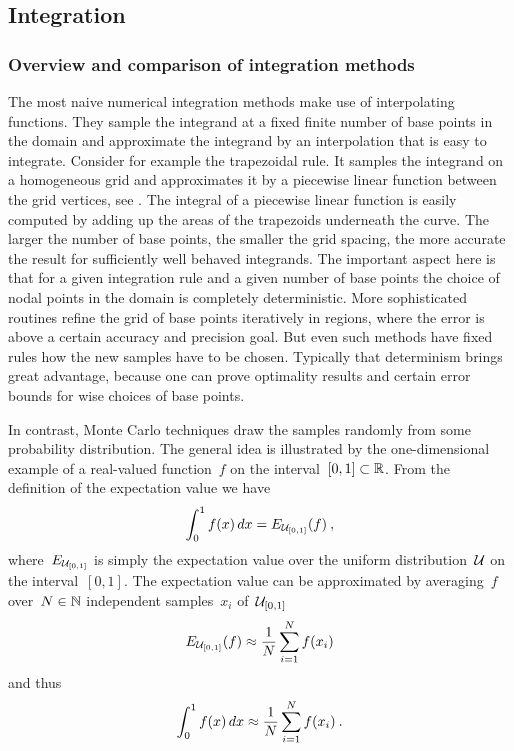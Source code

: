 \subsection{Integration}

\subsubsection{Overview and comparison of integration methods}

The most naive numerical integration methods make use of interpolating
functions. They sample the integrand at a fixed finite number of base points in
the domain and approximate the integrand by an interpolation that is easy to
integrate. Consider for example the trapezoidal rule. It samples the integrand
on a homogeneous grid and approximates it by a piecewise linear function between
the grid vertices, see . The integral of a piecewise linear
function is easily computed by adding up the areas of the trapezoids underneath
the curve. The larger the number of base points, \ie{} the smaller the grid
spacing, the more accurate the result for sufficiently well behaved integrands.
The important aspect here is that for a given integration rule and a given
number of base points the choice of nodal points in the domain is completely
deterministic. More sophisticated routines refine the grid of base points
iteratively in regions, where the error is above a certain accuracy and
precision goal. But even such  methods have fixed rules how
the new samples have to be chosen. Typically that determinism brings great
advantage, because one can prove optimality results and certain error bounds for
wise choices of base points.

In contrast, Monte Carlo techniques draw the samples randomly from some
probability distribution. The general idea is illustrated by the one-dimensional
example of a real-valued function~$f$ on the interval~$[0,1] \subset \mathbb{R}$. From
the definition of the expectation value we have
%
\begin{equation}\label{mcsimple}
  \int_0^1 f(x) \,dx = E_{\mathcal{U}_{[0,1]}}(f)\:,
\end{equation}
%
where~$E_{\mathcal{U}_{[0,1]}}$ is simply the expectation value over the uniform
distribution~$\mathcal{U}$ on the interval~$[0,1]$. The expectation value can be
approximated by averaging~$f$ over~$N \in \mathbb{N}$ independent samples~${x_i}$
of~$\mathcal{U}_{[0,1]}$
%
\begin{equation}\label{evapprox}
  E_{\mathcal{U}_{[0,1]}}(f) \approx \frac{1}{N} \sum_{i=1}^N f(x_i)
\end{equation}
%
and thus
%
\begin{equation}\label{mcsapprox}
  \int_0^1 f(x) \,dx \approx \frac{1}{N} \sum_{i=1}^N f(x_i)\:.
\end{equation}

